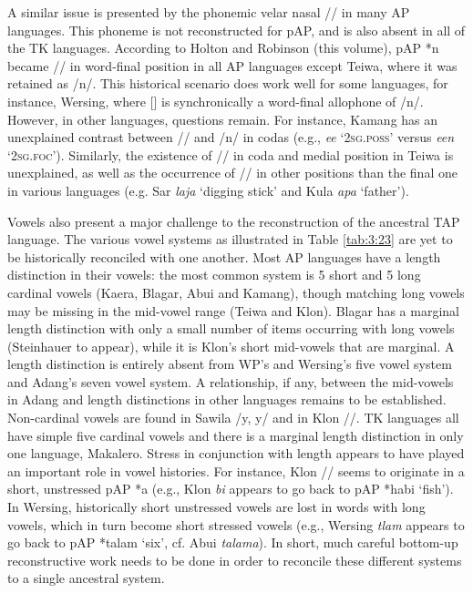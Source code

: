 \documentclass[output=paper]{LSP/langsci}
\begin{document}
A similar issue is presented by the phonemic velar nasal /{\ng}/ in many AP languages. This phoneme is not reconstructed for pAP, and is also absent in all of the TK languages. According to Holton and Robinson (this volume), pAP *n became /{\ng}/ in word-final position in all AP languages except Teiwa, where it was retained as /n/. This historical scenario does work well for some languages, for instance, Wersing, where [{\ng}] is synchronically a word-final allophone of /n/. However, in other languages, questions remain. For instance, Kamang has an unexplained contrast between /{\ng}/ and /n/ in codas (e.g., \textit{ee{\ng}} `\textsc{2sg.poss'} versus \textit{een} `\textsc{2sg.foc'}). Similarly, the existence of /{\ng}/ in coda and medial position in Teiwa is unexplained, as well as the occurrence of /{\ng}/ in other positions than the final one in various languages (e.g. Sar \textit{la{\ng}ja} `digging stick' and Kula \textit{{\ng}apa} `father'). 

Vowels also present a major challenge to the reconstruction of the ancestral TAP language. The various vowel systems as illustrated in Table \ref{tab:3:23} are yet to be historically reconciled with one another. Most AP languages have a length distinction in their vowels: the most common system is 5 short and 5 long cardinal vowels (Kaera, Blagar, Abui and Kamang), though matching long vowels may be missing in the mid-vowel range (Teiwa and Klon). Blagar has a marginal length distinction with only a small number of items occurring with long vowels (Steinhauer to appear), while it is Klon's short mid-vowels that are marginal. A length distinction is entirely absent from WP's and Wersing's five vowel system and Adang's seven vowel system. A relationship, if any, between the mid-vowels in Adang and length distinctions in other languages remains to be established. Non-cardinal vowels are found in Sawila /y, y{\textlengthmark}/ and in Klon /{\textschwa}/. TK languages all have simple five cardinal vowels and there is a 
marginal length distinction in only one language, Makalero. Stress in conjunction with length appears to have played an important role in vowel histories. For instance, Klon /{\textschwa}/ seems to originate in a short, unstressed pAP *a (e.g., Klon \textit{{\textschwa}bi} appears to go back to pAP *ha{\textprimstress}bi `fish'). In Wersing, historically short unstressed vowels are lost in words with long vowels, which in turn become short stressed vowels (e.g., Wersing \textit{tlam} appears to go back to pAP *tala{\textlengthmark}m `six', cf. Abui \textit{tala{\textlengthmark}ma}). In short, much careful bottom-up reconstructive work needs to be done in order to reconcile these different systems to a single ancestral system.
 
\end{document}
